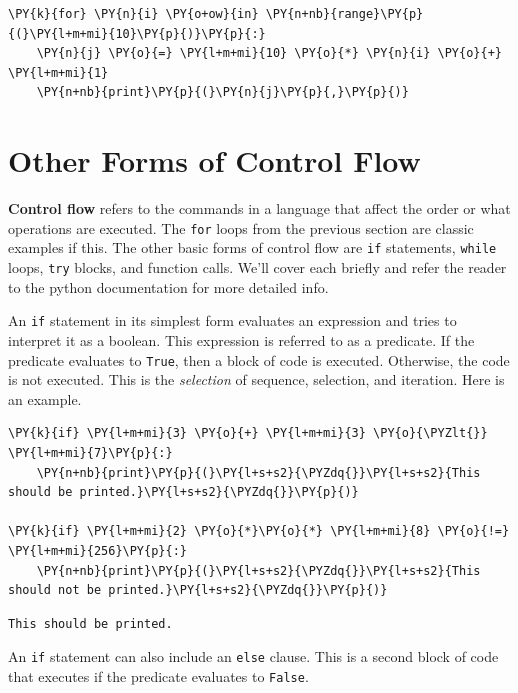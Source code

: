 \begin{Verbatim}[commandchars=\\\{\}]
\PY{k}{for} \PY{n}{i} \PY{o+ow}{in} \PY{n+nb}{range}\PY{p}{(}\PY{l+m+mi}{10}\PY{p}{)}\PY{p}{:}
    \PY{n}{j} \PY{o}{=} \PY{l+m+mi}{10} \PY{o}{*} \PY{n}{i} \PY{o}{+} \PY{l+m+mi}{1}
    \PY{n+nb}{print}\PY{p}{(}\PY{n}{j}\PY{p}{,}\PY{p}{)}
\end{Verbatim}


\section{Other Forms of Control Flow}


\textbf{Control flow} refers to the commands in a language that affect the order or what operations are executed.
The \texttt{for} loops from the previous section are classic examples if this.  The other basic forms of control flow are \texttt{if} statements, \texttt{while} loops,  \texttt{try} blocks, and function calls.  We’ll cover each briefly and refer the reader to the python documentation for more detailed info.


An \texttt{if} statement in its simplest form evaluates an expression and tries to interpret it as a boolean.  This expression is referred to as a predicate.  If the predicate evaluates to \texttt{True}, then a block of code is executed.  Otherwise, the code is not executed.  This is the \emph{selection} of sequence, selection, and iteration.  Here is an example.


\begin{Verbatim}[commandchars=\\\{\}]
\PY{k}{if} \PY{l+m+mi}{3} \PY{o}{+} \PY{l+m+mi}{3} \PY{o}{\PYZlt{}} \PY{l+m+mi}{7}\PY{p}{:}
    \PY{n+nb}{print}\PY{p}{(}\PY{l+s+s2}{\PYZdq{}}\PY{l+s+s2}{This should be printed.}\PY{l+s+s2}{\PYZdq{}}\PY{p}{)}

\PY{k}{if} \PY{l+m+mi}{2} \PY{o}{*}\PY{o}{*} \PY{l+m+mi}{8} \PY{o}{!=} \PY{l+m+mi}{256}\PY{p}{:}
    \PY{n+nb}{print}\PY{p}{(}\PY{l+s+s2}{\PYZdq{}}\PY{l+s+s2}{This should not be printed.}\PY{l+s+s2}{\PYZdq{}}\PY{p}{)}
\end{Verbatim}

\begin{Verbatim}
This should be printed.
\end{Verbatim}


An \texttt{if} statement can also include an \texttt{else} clause.  This is a second block of code that executes if the predicate evaluates to \texttt{False}.


